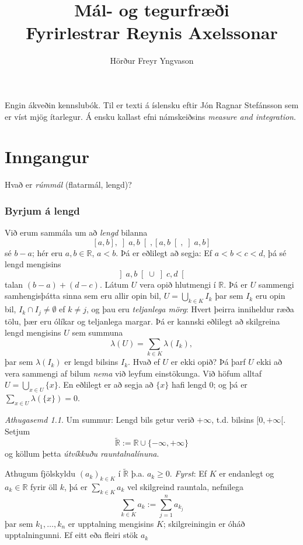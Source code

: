 \documentclass[a4paper,icelandic,11pt]{book}
\title{\textbf{Mál- og tegurfræði}\\Fyrirlestrar Reynis Axelssonar}
\author{Hörður Freyr Yngvason}
\date{}
\theoremstyle{plain}      \newtheorem{setn}{Setning}[chapter]
\theoremstyle{definition} \newtheorem{skilgr}[setn]{Skilgreining}
\theoremstyle{remark}     \newtheorem*{ath}{Athugasemd}
\newcommand{\R}{\mathbb R}
\begin{document}
\maketitle
\tableofcontents

Engin ákveðin kennslubók. Til er texti á íslensku eftir Jón Ragnar
Stefánsson sem er víst mjög ítarlegur. Á ensku kallast efni
námskeiðsins \emph{measure and integration}.

\chapter{Inngangur}
Hvað er \emph{rúmmál} (flatarmál, lengd)?

\subsection{Byrjum á lengd}
Við erum sammála um að \emph{lengd} bilanna
\[
\left[a,b\right],
\left]a,b\right[,
\left[a,b\right[,
\left]a,b\right]
\]
sé $b-a$; hér eru $a,b\in\R$, $a<b$. Þá er eðlilegt að segja: Ef
$a<b<c<d$, þá sé lengd mengisins
\[
\left]a,b\right[ \cup \left]c,d\right[
\]
talan $(b-a)+(d-c)$. Látum $U$ vera opið hlutmengi í $\R$. Þá er $U$
sammengi samhengisþátta sinna sem eru allir opin bil,
$U=\bigcup_{k\in{K}}I_{k}$ þar sem $I_{k}$ eru opin bil,
$I_{k}\cap{I_{j}}\ne\emptyset$ ef $k\ne j$, og þau eru
\emph{teljanlega mörg}: Hvert þeirra inniheldur ræða tölu, þær eru
ólíkar og teljanlega margar. Þá er kannski eðlilegt að skilgreina
lengd mengisins $U$ sem summuna
\[
\lambda(U)=\sum_{k\in K}\lambda(I_{k}),
\]
þar sem $\lambda(I_{k})$ er lengd bilsins $I_{k}$. Hvað ef $U$ er ekki
opið?  Þá þarf $U$ ekki að vera sammengi af bilum \emph{nema} við
leyfum einstökunga. Við höfum alltaf $U=\bigcup_{x\in U}\{x\}$. En
eðlilegt er að segja að $\{x\}$ hafi lengd 0; og þá er $\sum_{x\in U}
\lambda(\{x\}) = 0$.
\begin{ath}
  Um summur: Lengd bils getur verið $+\infty$, t.d. bilsins
  $[0,+\infty[$. Setjum
  \[
  \tilde{\R} :={\R}\cup\{-\infty,+\infty\}
  \]
  og köllum þetta \emph{útvíkkuðu rauntalnalínuna}.
\end{ath}
Athugum fjölskyldu $(a_k)_{k\in K}$ í $\tilde{\R}$ þ.a. $a_{k}\ge 0$.
\emph{Fyrst}: Ef $K$ er endanlegt og $a_{k}\in\R$ fyrir öll $k$, þá er
$\sum_{k\in K}a_{k}$ vel skilgreind rauntala, nefnilega
\[
\sum_{k\in K}a_{k}:=\sum_{j=1}^{n}a_{k_{j}}
\]
þar sem $k_{1},\dots,k_{n}$ er upptalning mengisins $K$;
skilgreiningin er óháð upptalningunni. Ef eitt eða fleiri stök $a_{k}$
\end{document}
